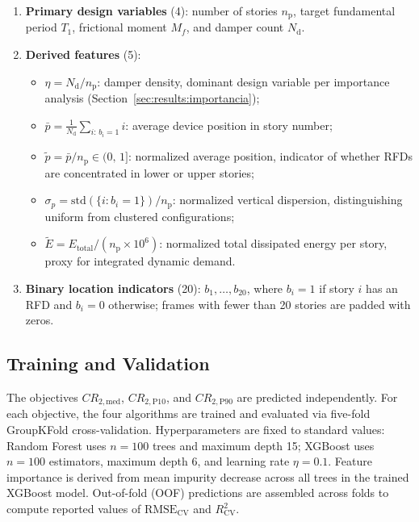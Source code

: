 \documentclass[preprint,12pt,authoryear]{elsarticle}
\newcommand{\CR}[1]{CR_{2,\text{#1}}}
\newcommand{\RMSE}{\mathrm{RMSE_{CV}}}       %
\newcommand{\Rsq}{R^{2}_{\mathrm{CV}}}
\newcommand{\nd}{N_{\mathrm{d}}}
\newcommand{\np}{n_{\mathrm{p}}}              %
\newcommand{\etad}{\eta}
\newcommand{\Mf}{M_{\!f}}
\begin{document}
\begin{enumerate}[label=\textit{\roman*})]
    \item \textbf{Primary design variables} (4):
          number of stories $\np$, target fundamental period $T_1$,
          frictional moment $\Mf$, and damper count $\nd$.

    \item \textbf{Derived features} (5):
    \begin{itemize}
        \item $\etad = \nd/\np$: damper density, dominant design variable per importance
              analysis (Section~\ref{sec:results:importancia});
        \item $\bar{p} = \tfrac{1}{\nd}\sum_{i:\,b_i=1} i$: average device position in story number;
        \item $\tilde{p} = \bar{p}/\np \in (0,\,1]$: normalized average position, indicator
              of whether RFDs are concentrated in lower or upper stories;
        \item $\sigma_p = \mathrm{std}\!\left(\{i:b_i=1\}\right)/\np$:
              normalized vertical dispersion, distinguishing uniform from clustered configurations;
        \item $\tilde{E} = E_{\mathrm{total}}/(\np\times10^6)$: normalized total dissipated
              energy per story, proxy for integrated dynamic demand.
    \end{itemize}

    \item \textbf{Binary location indicators} (20):
          $b_1,\ldots,b_{20}$, where $b_i=1$ if story $i$ has an RFD and $b_i=0$ otherwise;
          frames with fewer than 20 stories are padded with zeros.
\end{enumerate}

\subsection{Training and Validation}
\label{sec:method:entrenamiento}

The objectives $\CR{med}$, $\CR{P10}$, and $\CR{P90}$ are predicted independently. For each objective,
the four algorithms are trained and evaluated via five-fold GroupKFold cross-validation. Hyperparameters
are fixed to standard values: Random Forest uses $n=100$ trees and maximum depth 15; XGBoost uses $n=100$
estimators, maximum depth 6, and learning rate $\eta=0.1$. Feature importance is derived from mean impurity
decrease across all trees in the trained XGBoost model. Out-of-fold (OOF) predictions are assembled across
folds to compute reported values of $\RMSE$ and $\Rsq$.
\end{document}
